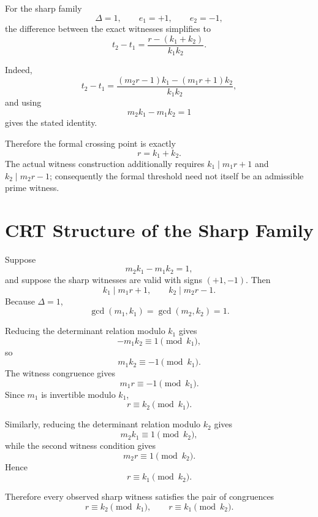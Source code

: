 \documentclass[11pt,a4paper]{article}
\begin{document}
For the sharp family
\[
    \Delta=1,
    \qquad
    e_1=+1,
    \qquad
    e_2=-1,
\]
the difference between the exact witnesses simplifies to
\begin{equation}
    \boxed{
    t_2-t_1
    =
    \frac{r-(k_1+k_2)}{k_1k_2}.
    }
\end{equation}

Indeed,
\[
    t_2-t_1
    =
    \frac{(m_2r-1)k_1-(m_1r+1)k_2}
         {k_1k_2},
\]
and using
\[
    m_2k_1-m_1k_2=1
\]
gives the stated identity.

Therefore the formal crossing point is exactly
\[
    r=k_1+k_2.
\]
The actual witness construction additionally requires $k_1\mid m_1r+1$ and $k_2\mid m_2r-1$; consequently the formal threshold need not itself be an admissible prime witness.

\section{CRT Structure of the Sharp Family}

Suppose
\begin{equation}
    m_2k_1-m_1k_2=1,
\end{equation}
and suppose the sharp witnesses are valid with signs $(+1,-1)$. Then
\begin{equation}
    k_1\mid m_1r+1,
    \qquad
    k_2\mid m_2r-1.
\end{equation}
Because $\Delta=1$,
\[
    \gcd(m_1,k_1)=\gcd(m_2,k_2)=1.
\]

Reducing the determinant relation modulo $k_1$ gives
\[
    -m_1k_2\equiv1\pmod{k_1},
\]
so
\[
    m_1k_2\equiv-1\pmod{k_1}.
\]
The witness congruence gives
\[
    m_1r\equiv-1\pmod{k_1}.
\]
Since $m_1$ is invertible modulo $k_1$,
\begin{equation}
    \boxed{
    r\equiv k_2\pmod{k_1}.
    }
\end{equation}

Similarly, reducing the determinant relation modulo $k_2$ gives
\[
    m_2k_1\equiv1\pmod{k_2},
\]
while the second witness condition gives
\[
    m_2r\equiv1\pmod{k_2}.
\]
Hence
\begin{equation}
    \boxed{
    r\equiv k_1\pmod{k_2}.
    }
\end{equation}

Therefore every observed sharp witness satisfies the pair of congruences
\begin{equation}
    \boxed{
    r\equiv k_2\pmod{k_1},
    \qquad
    r\equiv k_1\pmod{k_2}.
    }
\end{equation}
\end{document}
